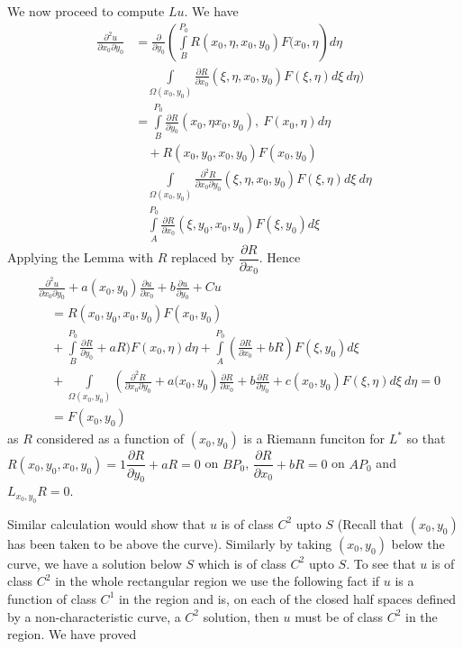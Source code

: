 We now proceed to compute $Lu$. We have
\begin{align*}
\frac{\partial^{2}u}{\partial x_{0}\partial y_{0}} &= \frac{\partial}{\partial y_{0}}\left(\int\limits^{P_{0}}_{B}R(x_{0},\eta,x_{0},y_{0})F(x_{0},\eta\right)d\eta\\[3pt]
&\quad \int\limits_{\Omega(x_{0},y_{0})}\frac{\partial R}{\partial x_{0}}(\xi, \eta, x_{0}, y_{0})F(\xi,\eta)d\xi \ d\eta)\\[3pt]
&= \int\limits^{P_{0}}_{B}\frac{\partial R}{\partial y_{0}}(x_{0},\eta x_{0},y_{0}), \ F(x_{0},\eta)d\eta\\[3pt]
&\quad +R(x_{0},y_{0},x_{0},y_{0})F(x_{0},y_{0})\\[3pt]
&\quad \int\limits_{\Omega(x_{0},y_{0})}\frac{\partial^{2}R}{\partial x_{0}\partial y_{0}}(\xi, \eta, x_{0}, y_{0})F(\xi,\eta)d\xi \ d\eta\\[3pt]
&\quad \int\limits^{P_{0}}_{A}\frac{\partial R}{\partial x_{0}}(\xi, y_{0}, x_{0}, y_{0})F(\xi, y_{0})d\xi
\end{align*}\pageoriginale
Applying the Lemma with $R$ replaced by $\dfrac{\partial R}{\partial x_{0}}$. Hence
\begin{align*}
& \frac{\partial^{2}u}{\partial x_{0}\partial y_{0}}+a(x_{0},y_{0})\frac{\partial u}{\partial x_{0}}+b\frac{\partial u}{\partial y_{0}}+Cu\\[3pt]
&\quad = R(x_{0},y_{0},x_{0},y_{0})F(x_{0},y_{0})\\[3pt]
&\quad +\int\limits^{P_{0}}_{B}\frac{\partial R}{\partial y_{0}}+aR)F(x_{0},\eta)d\eta+\int\limits^{P_{0}}_{A}\left(\frac{\partial R}{\partial x_{0}}+bR\right)F(\xi,y_{0})d\xi\\[3pt]
&\quad +\int\limits_{\Omega (x_{0},y_{0})}\left(\frac{\partial^{2}R}{\partial x_{0}\partial y_{0}}+a(x_{0},y_{0}\right)\frac{\partial R}{\partial x_{0}}+b\frac{\partial R}{\partial y_{0}}+c(x_{0},y_{0})F(\xi,\eta)d\xi \ d\eta =0\\[3pt]
&\quad = F(x_{0},y_{0})
\end{align*}
as $R$ considered as a function of $(x_{0},y_{0})$ is a Riemann funciton for $L^{*}$ so that $R(x_{0},y_{0},x_{0},y_{0})=1\dfrac{\partial R}{\partial y_{0}}+aR=0$ on $BP_{0}$, $\dfrac{\partial R}{\partial x_{0}}+bR=0$ on $AP_{0}$ and $L_{x_{0},y_{0}}R=0$.

Similar calculation would show that $u$ is of class $C^{2}$ upto $S$ (Recall that $(x_{0},y_{0})$ has been taken to be above the curve). Similarly by taking $(x_{0},y_{0})$ below the curve, we have a solution below $S$ which is of class $C^{2}$ upto $S$. To see that $u$ is of class $C^{2}$ in the whole rectangular region we use the following fact if $u$ is a function of class $C^{1}$ in the region and is, on each of the closed half spaces defined by a non-characteristic curve, a $C^{2}$ solution, then $u$ must be of class $C^{2}$ in the region. We have proved 

